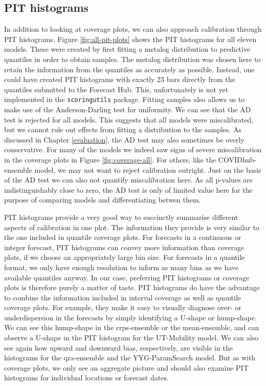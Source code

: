 \documentclass[
]{book}
\begin{document}
\hypertarget{pit-histograms}{%
\subsection{PIT histograms}\label{pit-histograms}}

In addition to looking at coverage plots, we can also approach calibration through PIT histograms. Figure \ref{fig:all-pit-plots} shows the PIT histograms for all eleven models. These were created by first fitting a metalog distribution to predictive quantiles in order to obtain samples. The metalog distribution was chosen here to retain the information from the quantiles as accurately as possible. Instead, one could have created PIT histograms with exactly 23 bars directly from the quantiles submitted to the Forecast Hub. This, unfortunately is not yet implemented in the \texttt{scoringutils} package. Fitting samples also allows us to make use of the Anderson-Darling test for uniformity. We can see that the AD test is rejected for all models. This suggests that all models were miscalibrated, but we cannot rule out effects from fitting a distribution to the samples. As discussed in Chapter \ref{evaluation}, the AD test may also sometimes be overly conservative. For many of the models we indeed saw signs of severe miscalibration in the coverage plots in Figure \ref{fig:coverage-all}. For others, like the COVIDhub-ensemble model, we may not want to reject calibration outright. Just on the basis of the AD test we can also not quantify miscalibration here. As all p-values are indistinguishably close to zero, the AD test is only of limited value here for the purpose of comparing models and differentiating betwen them.

PIT histograms provide a very good way to succinctly summarise different aspects of calibration in one plot. The information they provide is very similar to the one included in quantile coverage plots. For forecasts in a continuous or integer forecast, PIT histograms can convey more information than coverage plots, if we choose an appropriately large bin size. For forecasts in a quantile format, we only have enough resolution to inform as many bins as we have available quantiles anyway. In our case, preferring PIT histograms or coverage plots is therefore purely a matter of taste. PIT histograms do have the advantage to combine the information included in interval coverage as well as quantile coverage plots. For example, they make it easy to visually diagnose over- or underdispersion in the forecasts by simply identifying a U-shape or hump-shape. We can see this hump-shape in the crps-ensemble or the mean-ensemble, and can observe a U-shape in the PIT histogram for the UT-Mobility model. We can also see again how upward and downward bias, respectively, are visible in the histograms for the qra-ensemble and the YYG-ParamSearch model. But as with coverage plots, we only see an aggregate picture and should also examine PIT histograms for individual locations or forecast dates.
\end{document}
